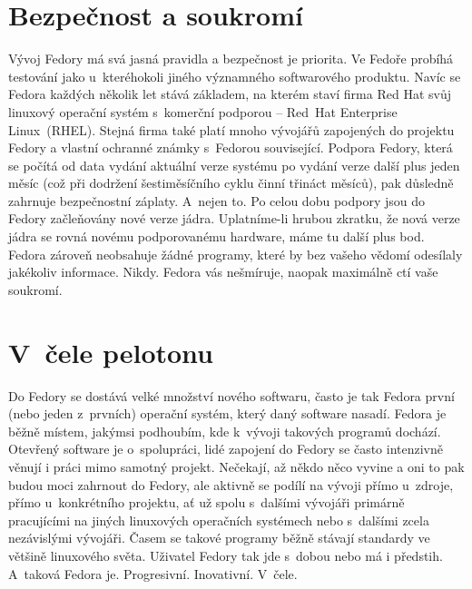 \section*{Bezpečnost a soukromí}
Vývoj Fedory má svá jasná pravidla a bezpečnost je priorita. Ve Fedoře probíhá testování jako u~kteréhokoli jiného významného softwarového produktu. Navíc se Fedora každých několik let stává základem, na kterém staví firma Red Hat svůj linuxový operační systém s~komerční podporou -- Red~Hat Enter\-prise Linux~(RHEL). Stejná firma také platí mnoho vývojářů zapojených do projektu Fedory a vlastní ochranné známky s~Fedorou související. Podpora Fedory, která se počítá od data vydání aktuální verze systému po vydání verze další plus jeden měsíc (což při dodržení šestiměsíčního cyklu činní třináct měsíců), pak důsledně zahrnuje bezpečnostní záplaty. A~nejen to. Po celou dobu podpory jsou do Fedory začleňovány nové verze jádra. Uplatníme-li hrubou zkratku, že nová verze jádra se rovná novému podporovanému hardware, máme tu další plus bod. Fedora zároveň neobsahuje žádné programy, které by bez vašeho vědomí odesílaly jakékoliv informace. Nikdy. Fedora vás nešmíruje, naopak maximálně ctí vaše soukromí.

\section*{V~čele pelotonu}
Do Fedory se dostává velké množství nového softwaru, často je tak Fedora první (nebo jeden z~prvních) operační systém, který daný software nasadí. Fedora je běžně místem, jakýmsi podhoubím, kde k~vývoji takových programů dochází. Otevřený software je o~spolupráci, lidé zapojení do Fedory se často intenzivně věnují i práci mimo samotný projekt. Nečekají, až někdo něco vyvine a oni to pak budou moci zahrnout do Fedory, ale aktivně se podílí na vývoji přímo u~zdroje, přímo u~konkrétního projektu, ať už spolu s~dalšími vývojáři primárně pracujícími na jiných linuxových operačních systémech nebo s~dalšími zcela nezávislými vývojáři. Časem se takové programy běžně stávají standardy ve většině linuxového světa. Uživatel Fedory tak jde s~dobou nebo má i předstih. A~taková Fedora je. Progresivní. Inovativní. V~čele.

